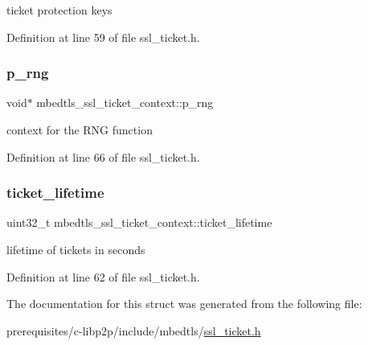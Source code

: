 ticket protection keys 

Definition at line 59 of file ssl\+\_\+ticket.\+h.

\mbox{\label{structmbedtls__ssl__ticket__context_a304d8f181d24a4ddbe5b7f0052229b9c}} 
\subsubsection{\texorpdfstring{p\+\_\+rng}{p\_rng}}
{\footnotesize\ttfamily void$\ast$ mbedtls\+\_\+ssl\+\_\+ticket\+\_\+context\+::p\+\_\+rng}

context for the R\+NG function 

Definition at line 66 of file ssl\+\_\+ticket.\+h.

\mbox{\label{structmbedtls__ssl__ticket__context_ae2548112f1ab8d5ceb7752a205ce358c}} 
\subsubsection{\texorpdfstring{ticket\+\_\+lifetime}{ticket\_lifetime}}
{\footnotesize\ttfamily uint32\+\_\+t mbedtls\+\_\+ssl\+\_\+ticket\+\_\+context\+::ticket\+\_\+lifetime}

lifetime of tickets in seconds 

Definition at line 62 of file ssl\+\_\+ticket.\+h.



The documentation for this struct was generated from the following file\+:\begin{DoxyCompactItemize}
\item 
prerequisites/c-\/libp2p/include/mbedtls/\mbox{\hyperlink{ssl__ticket_8h}{ssl\+\_\+ticket.\+h}}\end{DoxyCompactItemize}
